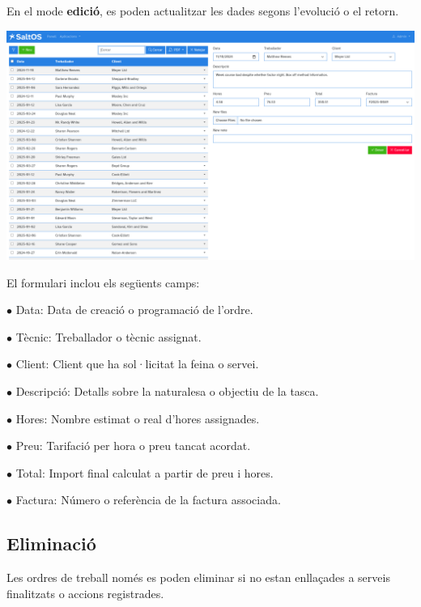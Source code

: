 \documentclass[a4paper]{article}
\begin{document}
En el mode \textbf{edició}, es poden actualitzar les dades segons l'evolució o el retorn.

\begin{center}\includegraphics[width=1\textwidth]{../ujest/snaps/test-screenshots-js-screenshots-sales-workorders-edit-100-ca-es-1-snap.png}\end{center}

El formulari inclou els següents camps:

\begin{compactitem}
\item[\color{myblue}$\bullet$] Data: Data de creació o programació de l'ordre.
\item[\color{myblue}$\bullet$] Tècnic: Treballador o tècnic assignat.
\item[\color{myblue}$\bullet$] Client: Client que ha sol·licitat la feina o servei.
\item[\color{myblue}$\bullet$] Descripció: Detalls sobre la naturalesa o objectiu de la tasca.
\item[\color{myblue}$\bullet$] Hores: Nombre estimat o real d'hores assignades.
\item[\color{myblue}$\bullet$] Preu: Tarifació per hora o preu tancat acordat.
\item[\color{myblue}$\bullet$] Total: Import final calculat a partir de preu i hores.
\item[\color{myblue}$\bullet$] Factura: Número o referència de la factura associada.
\end{compactitem}

\hypertarget{toc175}{}
\subsection{Eliminació}

Les ordres de treball només es poden eliminar si no estan enllaçades a serveis finalitzats o accions registrades.
\end{document}
